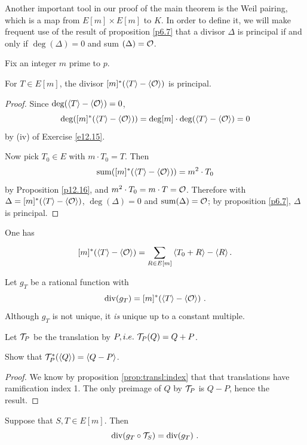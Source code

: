 Another important tool in our proof of the main theorem is the Weil pairing, which is a map from $E[m]\times E[m]$ to $K$. In order to define it, we will make frequent use of the result of proposition \ref{p6.7} that a divisor $\Delta$ is principal if and only if $\deg(\Delta)=0$ and sum $(\Delta)=\mathcal{O}$.

Fix an integer $m$ prime to $p$.

\begin{lem}
\label{l13.1}
For $T\in E[m]$, the divisor $[m]^{*}(\left\langle T \right \rangle-\left\langle \mathcal{O} \right \rangle)$ is principal.
\end{lem}

\begin{proof} Since $\deg(\left\langle T \right \rangle-\left\langle \mathcal{O} \right \rangle)=0$,
$$
\deg([m]^{*}(\left\langle T \right \rangle-\left\langle \mathcal{O} \right \rangle))=\deg[m]\cdot\deg(\left\langle T \right \rangle-\left\langle \mathcal{O} \right \rangle)=0
$$
by (iv) of Exercise \ref{e12.15}.

Now pick $T_{0}\in E$ with $m\cdot T_{0}=T$. Then 
\[\operatorname{sum}([m]^{*}(\left\langle T \right \rangle-\left\langle \mathcal{O} \right \rangle))=m^{2}\cdot T_{0}\]
by Proposition \ref{p12.16}, and $m^{2}\cdot T_{0}=m\cdot T=\mathcal{O}$. Therefore with $\Delta = [m]^{*}(\left\langle T \right \rangle-\left\langle \mathcal{O} \right \rangle)$, $\deg(\Delta)=0$ and $\operatorname{sum}(\Delta)=\mathcal{O}$; by proposition \ref{p6.7}, $\Delta$ is principal.
\end{proof}

One has
\[[m]^{*}(\left\langle T \right \rangle-\left\langle \mathcal{O} \right \rangle) = \sum^{}_{R\in E[m]} \left\langle T_0+R \right \rangle - \left\langle R \right \rangle .\]



Let $g_{T}$ be a rational function with
$$
\on{div}(g_{T})=[m]^{*}(\divisor{T}-\divisor{\cuz})\ .
$$
Although $g_{T}$ is not unique, it {\it is} unique up to a constant multiple.

Let $\mathcal{T}_{P}$ be the translation by $P,i.e.\ \mathcal{T}_{P}(Q)=Q+P$.

\begin{exo}
\label{e13.2}
Show that $\mathcal{T}_{P}^{*}(\left\langle Q \right \rangle)=\left\langle Q-P \right \rangle$.
\end{exo}

\begin{proof}
We know by proposition \ref{prop:transl:index} that that translations have ramification index 1. The only preimage of $Q$ by $\mathcal{T}_{P}$ is $Q-P$, hence the result.
\end{proof}

\begin{lem}
\label{l13.3}
Suppose that $S,T\in E[m]$. Then
$$
\operatorname{div}(g_{T}\circ \mathcal{T}_{S})=\operatorname{div}(g_{T})\ .
$$
\end{lem}

